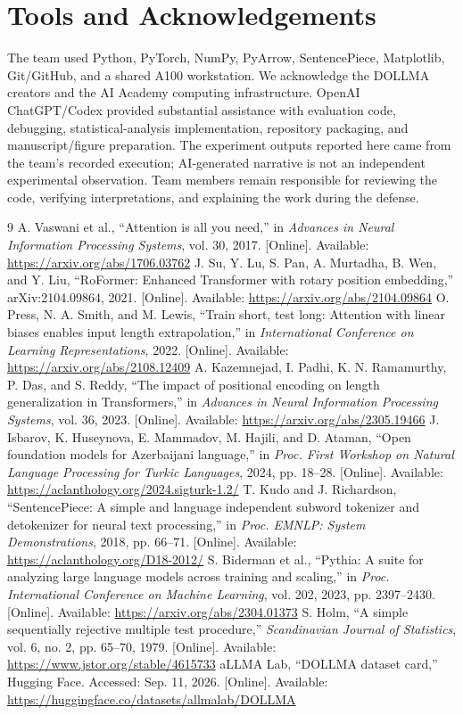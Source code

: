 \documentclass[conference]{IEEEtran}
\begin{document}
\section*{Tools and Acknowledgements}
The team used Python, PyTorch, NumPy, PyArrow, SentencePiece, Matplotlib, Git/GitHub, and a shared A100 workstation. We acknowledge the DOLLMA creators and the AI Academy computing infrastructure. OpenAI ChatGPT/Codex provided substantial assistance with evaluation code, debugging, statistical-analysis implementation, repository packaging, and manuscript/figure preparation. The experiment outputs reported here came from the team's recorded execution; AI-generated narrative is not an independent experimental observation. Team members remain responsible for reviewing the code, verifying interpretations, and explaining the work during the defense.

\begin{thebibliography}{9}
 A. Vaswani et al., ``Attention is all you need,'' in \emph{Advances in Neural Information Processing Systems}, vol. 30, 2017. [Online]. Available: \url{https://arxiv.org/abs/1706.03762}
 J. Su, Y. Lu, S. Pan, A. Murtadha, B. Wen, and Y. Liu, ``RoFormer: Enhanced Transformer with rotary position embedding,'' arXiv:2104.09864, 2021. [Online]. Available: \url{https://arxiv.org/abs/2104.09864}
 O. Press, N. A. Smith, and M. Lewis, ``Train short, test long: Attention with linear biases enables input length extrapolation,'' in \emph{International Conference on Learning Representations}, 2022. [Online]. Available: \url{https://arxiv.org/abs/2108.12409}
 A. Kazemnejad, I. Padhi, K. N. Ramamurthy, P. Das, and S. Reddy, ``The impact of positional encoding on length generalization in Transformers,'' in \emph{Advances in Neural Information Processing Systems}, vol. 36, 2023. [Online]. Available: \url{https://arxiv.org/abs/2305.19466}
 J. Isbarov, K. Huseynova, E. Mammadov, M. Hajili, and D. Ataman, ``Open foundation models for Azerbaijani language,'' in \emph{Proc. First Workshop on Natural Language Processing for Turkic Languages}, 2024, pp. 18--28. [Online]. Available: \url{https://aclanthology.org/2024.sigturk-1.2/}
 T. Kudo and J. Richardson, ``SentencePiece: A simple and language independent subword tokenizer and detokenizer for neural text processing,'' in \emph{Proc. EMNLP: System Demonstrations}, 2018, pp. 66--71. [Online]. Available: \url{https://aclanthology.org/D18-2012/}
 S. Biderman et al., ``Pythia: A suite for analyzing large language models across training and scaling,'' in \emph{Proc. International Conference on Machine Learning}, vol. 202, 2023, pp. 2397--2430. [Online]. Available: \url{https://arxiv.org/abs/2304.01373}
 S. Holm, ``A simple sequentially rejective multiple test procedure,'' \emph{Scandinavian Journal of Statistics}, vol. 6, no. 2, pp. 65--70, 1979. [Online]. Available: \url{https://www.jstor.org/stable/4615733}
 aLLMA Lab, ``DOLLMA dataset card,'' Hugging Face. Accessed: Sep. 11, 2026. [Online]. Available: \url{https://huggingface.co/datasets/allmalab/DOLLMA}
\end{thebibliography}
\end{document}
